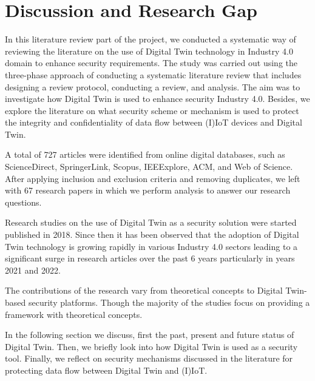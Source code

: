 
\section{Discussion and Research Gap}


In this literature review part of the project, we conducted a systematic way of reviewing the literature on the use of Digital Twin technology in Industry 4.0 domain to enhance security requirements. The study was carried out using the three-phase approach of conducting a systematic literature review that includes designing a review protocol, conducting a review, and analysis. The aim was to investigate how Digital Twin is used to enhance security Industry 4.0. Besides, we explore the literature on what security scheme or mechanism is used to protect the integrity and confidentiality of data flow between (I)IoT devices and Digital Twin.


A total of 727 articles were identified from online digital databases, such as ScienceDirect, SpringerLink, Scopus, IEEExplore, ACM, and Web of Science. After applying inclusion and exclusion criteria and removing duplicates, we left with 67 research papers in which we perform analysis to answer our research questions.

Research studies on the use of Digital Twin as a security solution were started published in 2018. Since then it has been observed that the adoption of Digital Twin technology is growing rapidly in various Industry 4.0 sectors leading to a significant surge in research articles over the past 6 years particularly in years 2021 and 2022. 

The contributions of the research vary from theoretical concepts to Digital Twin-based security platforms. Though the majority of the studies focus on providing a framework with theoretical concepts.

In the following section we discuss, first the past, present and future status of Digital Twin. Then, we briefly look into how Digital Twin is used as a security tool. Finally, we reflect on security mechanisms discussed in the literature for protecting data flow between Digital Twin and (I)IoT.

